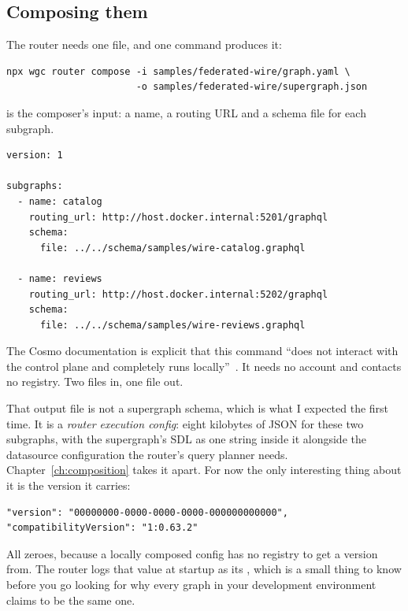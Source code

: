 \subsection*{Composing them}

%
The router needs one file, and one command produces it:

\begin{verbatim}
npx wgc router compose -i samples/federated-wire/graph.yaml \
                       -o samples/federated-wire/supergraph.json
\end{verbatim}

 is the composer's input: a name, a routing URL and a schema
file for each subgraph.

\begin{verbatim}
version: 1

subgraphs:
  - name: catalog
    routing_url: http://host.docker.internal:5201/graphql
    schema:
      file: ../../schema/samples/wire-catalog.graphql

  - name: reviews
    routing_url: http://host.docker.internal:5202/graphql
    schema:
      file: ../../schema/samples/wire-reviews.graphql
\end{verbatim}

%
The Cosmo documentation is explicit that this command \enquote{does not interact
with the control plane and completely runs
locally}~\autocite{cosmo2026routercompose}. It needs no account and contacts no
registry. Two files in, one file out.

That output file is not a supergraph schema, which is what I expected the first
time. It is a \emph{router execution config}: eight kilobytes of JSON for these
two subgraphs, with the supergraph's SDL as one string inside it alongside the
datasource configuration the router's query planner needs.
Chapter~\ref{ch:composition} takes it apart. For now the only interesting thing
about it is the version it carries:

\begin{verbatim}
"version": "00000000-0000-0000-0000-000000000000",
"compatibilityVersion": "1:0.63.2"
\end{verbatim}

All zeroes, because a locally composed config has no registry to get a version
from. The router logs that value at startup as its \code{config\_version}, which
is a small thing to know before you go looking for why every graph in your
development environment claims to be the same one.

